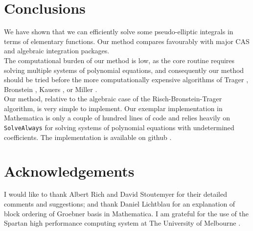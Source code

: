 \documentclass[12pt]{article}
\numberwithin{equation}{section}
\theoremstyle{definition}
\begin{document}
\iffalse
Some of the integrals which could not be computed with our method may be computed 
after splitting the integral into a sum of integrals, either by direct expansion, polynomial long 
division, or partial fractions. For example, 
%
\begin{equation*}
\int \frac{x^2+1}{(x-1)\sqrt{x^4-x^2+1}}dx = \int\frac{x}{\sqrt{x^4-x^2+1}}dx+\int\frac{x+1}{(x-1) \sqrt{x^4-x^2+1}}dx.
\end{equation*}
\fi

\section{Conclusions}

We have shown that we can efficiently solve some pseudo-elliptic integrals in terms of 
elementary functions. Our method compares favourably with major CAS and algebraic 
integration packages.  \\

The computational burden of our method is low, as the core routine requires 
solving multiple systems of polynomial equations, and consequently our method should be tried before the 
more computationally expensive algorithms of Trager \cite{Trager1979}\cite{Trager1984}, Bronstein 
\cite{Bronstein1990}, Kauers \cite{Kauers2008}, or Miller \cite{Miller2012}.\\

Our method, relative to the algebraic case of the Risch-Bronstein-Trager algorithm, is very simple to 
implement. Our exemplar implementation in Mathematica is only a couple of hundred lines of code and 
relies heavily on \texttt{SolveAlways} for solving systems of polynomial equations with undetermined 
coefficients. The implementation is available on github \cite{algebraic_github}. 

\section{Acknowledgements}
I would like to thank Albert Rich and David Stoutemyer for their detailed comments and suggestions; and 
thank Daniel Lichtblau for an explanation of block ordering of Groebner basis in Mathematica. I am 
grateful for the use of the Spartan high performance computing system at The University of 
Melbourne \cite{lafayette2016}. 


\end{document}
